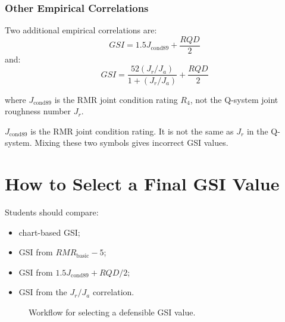 \documentclass[a4paper,12pt]{article}
\begin{document}
\subsubsection{Other Empirical Correlations}

Two additional empirical correlations are:
\[
GSI = 1.5J_{\text{cond89}} + \frac{RQD}{2}
\]
and:
\[
GSI =
\frac{52(J_r/J_a)}
{1+(J_r/J_a)}
+
\frac{RQD}{2}
\]

where \(J_{\text{cond89}}\) is the RMR joint condition rating \(R_4\), not the Q-system
joint roughness number \(J_r\).

\begin{warnbox}
\(J_{\text{cond89}}\) is the RMR joint condition rating. It is not the same as \(J_r\) in
the Q-system. Mixing these two symbols gives incorrect GSI values.
\end{warnbox}

\section{How to Select a Final GSI Value}

Students should compare:
\begin{itemize}
    \item chart-based GSI;
    \item GSI from \(RMR_{\text{basic}}-5\);
    \item GSI from \(1.5J_{\text{cond89}}+RQD/2\);
    \item GSI from the \(J_r/J_a\) correlation.
\end{itemize}

\begin{figure}[H]
\centering
{}
\caption{Workflow for selecting a defensible GSI value.}
\label{fig:gsi_selection}
\end{figure}
\end{document}
